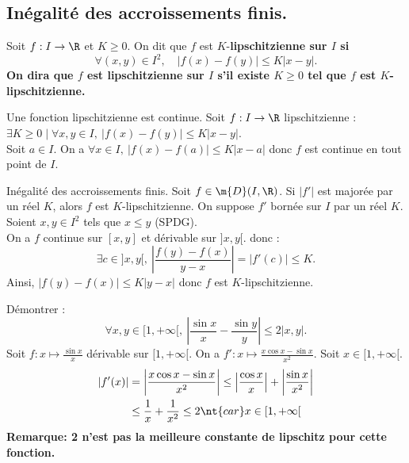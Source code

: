 \documentclass[11pt]{article}
\begin{document}
\subsection{Inégalité des accroissements finis.}

\begin{defi}{}{}
    Soit $f:I\to\R$ et $K\geq0$. On dit que $f$ est $K$-\bf{lipschitzienne} sur $I$ si
    \begin{equation*}
        \forall (x,y) \in I^2, \quad |f(x)-f(y)|\leq K|x-y|.
    \end{equation*}
    On dira que $f$ est \bf{lipschitzienne} sur $I$ s'il existe $K\geq0$ tel que $f$ est $K$-lipschitzienne.
\end{defi}

\begin{prop}{}{}
    Une fonction lipschitzienne est continue.
    \tcblower
    Soit $f:I\to\R$ lipschitzienne : $\exists K\geq0 \mid \forall x,y \in I, ~ |f(x)-f(y)|\leq K|x-y|$.\\
    Soit $a\in I$. On a $\forall x \in I, ~ |f(x)-f(a)|\leq K|x-a|$ donc $f$ est continue en tout point de $I$.
\end{prop}

\begin{thm}{Inégalité des accroissements finis.}{}
    Soit $f\in\m{D}(I,\R)$. Si $|f'|$ est majorée par un réel $K$, alors $f$ est $K$-lipschitzienne.
    \tcblower
    On suppose $f'$ bornée sur $I$ par un réel $K$. Soient $x,y\in I^2$ tels que $x\leq y$ (SPDG).\\
    On a $f$ continue sur $[x,y]$ et dérivable sur $]x,y[$. donc :
    \begin{equation*}
        \exists c \in ]x,y[, ~ \left|\frac{f(y)-f(x)}{y-x}\right|=|f'(c)|\leq K.
    \end{equation*}
    Ainsi, $|f(y)-f(x)|\leq K|y-x|$ donc $f$ est $K$-lipschitzienne.
\end{thm}

\begin{ex}{}{}
    Démontrer :
    \begin{equation*}
        \forall x,y \in [1,+\infty[, ~ \left|\frac{\sin x}{x} - \frac{\sin y}{y}\right| \leq 2|x,y|.
    \end{equation*}
    \tcblower
    Soit $f:x\mapsto\frac{\sin x}{x}$ dérivable sur $[1,+\infty[$. On a $f':x\mapsto\frac{x\cos x - \sin x}{x^2}$. Soit $x\in[1,+\infty[$.
    \begin{align*}
        |f'(x)| &= \left|\frac{x\cos x - \sin x}{x^2}\right| \leq \left|\frac{\cos x}{x}\right| + \left|\frac{\sin x}{x^2}\right|\\
        &\leq \frac{1}{x} + \frac{1}{x^2} \leq 2 \nt{ car } x\in[1,+\infty[
    \end{align*}
    \bf{Remarque: } 2 n'est pas la meilleure constante de lipschitz pour cette fonction.
\end{ex}
\end{document}

